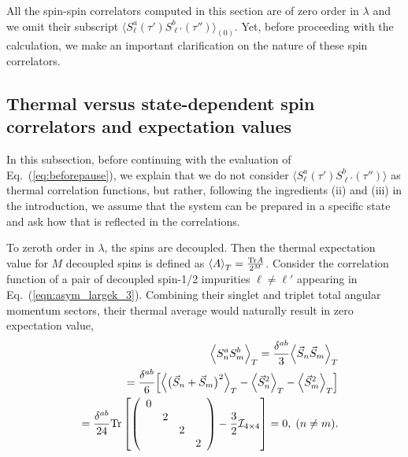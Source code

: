 \documentclass[aps,prb,twocolumn,superscriptaddress]{revtex4-1}
\newcommand{\Tr}[1]{\mathrm{Tr} #1}
\begin{document}
All the spin-spin correlators computed in this section are of zero order in $\lambda$ and we omit their subscript  $\langle S_{\ell}^{a}(\tau')S_{\ell'}^{b}(\tau'') \rangle_{(0)}$. Yet, before proceeding with the calculation, we make an important  clarification on the nature of these spin correlators. 





\subsection{Thermal versus state-dependent 
	\label{corrfuncstatedep}
	spin correlators and expectation values}
In this subsection, before continuing with the evaluation of Eq.~(\ref{eq:beforepause}), we explain that we do not consider $\langle S_{\ell}^{a}(\tau')S_{\ell'}^{b}(\tau'') \rangle$ as thermal correlation functions, but rather, following the ingredients (ii) and (iii) in the introduction, we assume that the system can be prepared in a specific state and ask how that is reflected in the correlations.

To zeroth order in $\lambda$, the spins are decoupled. Then the thermal expectation value for $M$ decoupled spins is defined as
$\braket{A}_{T}=\frac{\Tr{A}}{2^{M}}$.
Consider the correlation function of a pair of decoupled spin-1/2 impurities $\ell \ne \ell'$ appearing in Eq.~(\ref{eqn:asym_largek_3}). 
 Combining their singlet and triplet total angular momentum sectors, their thermal average would naturally result in zero expectation value,
\begin{eqnarray}
&&\Bigl\langle{S_{n}^{a}S_{m}^{b}\Bigr\rangle}_{T}=\frac{\delta^{ab}}{3}\Bigl\langle{\vec{S}_{n}\vec{S}_{m}\Bigr\rangle}_{T} \label{eqn:asym_largek_4} \\
&&=\frac{\delta^{ab}}{6}\Bigl[\Bigl\langle{\bigr(\vec{S}_{n}+\vec{S}_{m}\bigr)^{2}\Bigr\rangle}_{T}-\Bigl\langle{\vec{S}_{n}^{2}\Bigr\rangle}_{T}-\Bigl\langle{\vec{S}_{m}^{2}\Bigr\rangle}_{T}\Bigr] \nonumber \\
&&=\frac{\delta^{ab}}{24}\Tr{\left[\left( \begin{array}{cccc} 0 &  &  &  \\  & 2 &  &  \\  &  & 2 &  \\  &  &  & 2 \end{array} \right)-\frac{3}{2}\mathcal{I}_{4\times 4}\right]}=0,\;(n\ne m). \nonumber
\end{eqnarray}
\end{document}
